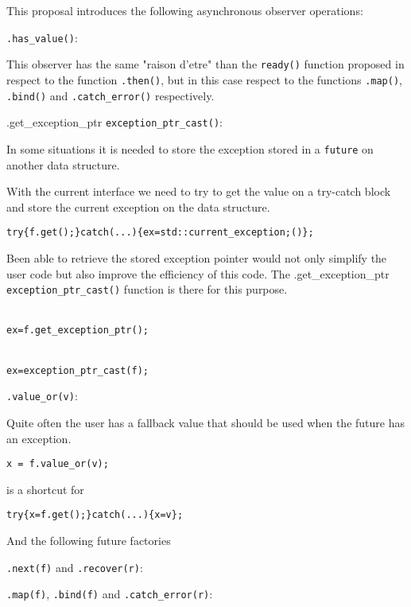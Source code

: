 \documentclass[a4paper,10pt]{article}
\newcommand{\cpp}[1]{\lstinline{#1}}
\newcommand{\suppress}[1]{\colorbox{suppress_color}{#1}}
\newcommand{\update}[1]{\colorbox{update_color}{#1}}
\begin{document}
This proposal introduces the following asynchronous observer operations:

\cpp{.has_value()}:

This observer has the same "raison d'etre" than the \cpp{ready()} function proposed in  \cite{N3784} respect to the function \cpp{.then()}, but in this case respect to the functions \cpp{.map()}, \cpp{.bind()} and \cpp{.catch_error()} respectively.

\suppress{.get_exception_ptr}\update{ \cpp{exception_ptr_cast()}:}

In some situations it is needed to store the exception stored in a \cpp{future} on another data structure. 

With the current interface we need to try to get the value on a try-catch block and store the current exception on the data structure. 

\begin{alltt}
try \{ f.get(); \} catch(...) \{ ex = std::current_exception;() \};
\end{alltt}

Been able to retrieve the stored exception \suppress{pointer} would not only simplify the user code but also improve the efficiency of this code. The \suppress{.get_exception_ptr}\update{ \cpp{exception_ptr_cast()}} function is there for this purpose.

\begin{alltt}
\suppress{
ex = f.get_exception_ptr();
}
\end{alltt}
\begin{alltt}
\update{
ex = exception_ptr_cast(f);
}
\end{alltt}
 

\cpp{.value_or(v)}:

Quite often the user has a fallback value that should be used when the future has an exception.

\begin{lstlisting}[xleftmargin=0pt]
x = f.value_or(v);
\end{lstlisting}

is a shortcut for 
\begin{alltt}
try \{ x = f.get(); \} catch(...) \{ x = v \};
\end{alltt}

And the following future factories

\suppress{
\cpp{.next(f)} and \cpp{.recover(r)}:
}

\update{
\cpp{.map(f)}, \cpp{.bind(f)} and \cpp{.catch_error(r)}:
}
\end{document}
